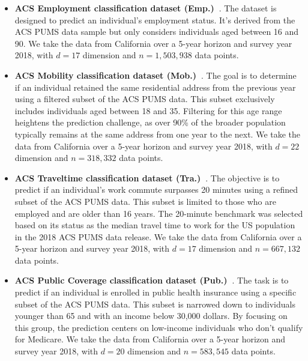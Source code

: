 \begin{itemize}
    \item \textbf{ACS Employment classification dataset (Emp.)~\citep{ding2021retiring}}. The dataset is designed to predict an individual's employment status. It's derived from the ACS PUMS data sample but only considers individuals aged between 16 and 90. We take the data from California over a 5-year horizon and survey year 2018, with $d=17$ dimension and $n=1,503,938$ data points.
    \item \textbf{ACS Mobility classification dataset (Mob.)~\citep{ding2021retiring}}. The goal is to determine if an individual retained the same residential address from the previous year using a filtered subset of the ACS PUMS data. This subset exclusively includes individuals aged between 18 and 35. Filtering for this age range heightens the prediction challenge, as over 90\% of the broader population typically remains at the same address from one year to the next. We take the data from California over a 5-year horizon and survey year 2018, with $d=22$ dimension and $n=318,332$ data points.
    \item \textbf{ACS Traveltime classification dataset (Tra.)~\citep{ding2021retiring}}. The objective is to predict if an individual's work commute surpasses 20 minutes using a refined subset of the ACS PUMS data. This subset is limited to those who are employed and are older than 16 years. The 20-minute benchmark was selected based on its status as the median travel time to work for the US population in the 2018 ACS PUMS data release. We take the data from California over a 5-year horizon and survey year 2018, with $d=17$ dimension and $n=667,132$ data points.
    \item \textbf{ACS Public Coverage classification dataset (Pub.)~\citep{ding2021retiring}}. The task is to predict if an individual is enrolled in public health insurance using a specific subset of the ACS PUMS data. This subset is narrowed down to individuals younger than 65 and with an income below 30,000 dollars. By focusing on this group, the prediction centers on low-income individuals who don't qualify for Medicare. We take the data from California over a 5-year horizon and survey year 2018, with $d=20$ dimension and $n=583,545$ data points.

\end{itemize}
